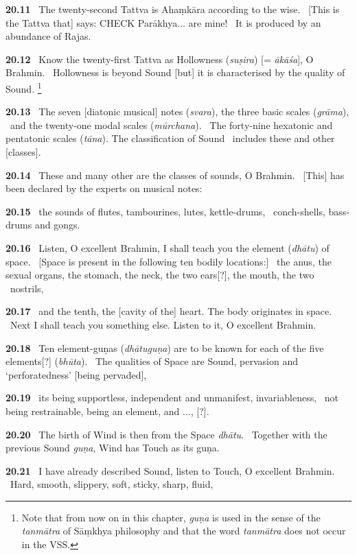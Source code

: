 \documentclass{article}
\newcommand{\skt}[1]{\textit{#1}}
\begin{document}
\textbf{20.11}%
\ The twenty-second Tattva is Ahaṃkāra according to the wise.%
\ [This is the Tattva that] says: CHECK Parākhya...  are mine!%
\                        It is produced by an abundance of Rajas.%


\textbf{20.12}%
\ Know the twenty-first Tattva as Hollowness (\skt{suṣira}) [= \skt{ākāśa}], O Brahmin.%
\ Hollowness is beyond Sound [but] it is characterised by the quality of Sound.%
\footnote{Note that from now on in this chapter, \skt{guṇa} is used in the sense of the \skt{tanmātra} of Sāṃkhya philosophy        and that the word \skt{tanmātra} does not occur in the VSS. }%


\textbf{20.13}%
\ The seven [diatonic musical] notes (\skt{svara}), the three basic scales (\skt{grāma}),%
\                and the twenty-one modal scales (\skt{mūrchana}).%
\ The forty-nine hexatonic and pentatonic scales (\skt{tāna}). The classification of Sound%
\                                 includes these and other [classes].%


\textbf{20.14}%
\ These and many other are the classes of sounds, O Brahmin.%
\ [This] has been declared by the experts on musical notes:%


\textbf{20.15}%
\ the sounds of flutes, tambourines, lutes, kettle-drums,%
\ conch-shells, bass-drums and gongs.%


\textbf{20.16}%
\ Listen, O excellent Brahmin, I shall teach you the element (\skt{dhātu}) of space.%
\ [Space is present in the following ten bodily locations:]%
\                 the anus, the sexual organs, the stomach, the neck, the two ears[?], the mouth, the two%
\                                         nostrils,%


\textbf{20.17}%
\ and the tenth, the [cavity of the] heart. The body originates in space.%
\ Next I shall teach you something else. Listen to it, O excellent Brahmin.%


\textbf{20.18}%
\ Ten element-guṇas (\skt{dhātuguṇa}) are to be known for each of the five elements[?] (\skt{bhūta}).%
\ The qualities of Space are Sound, pervasion and `perforatedness' [being pervaded],%


\textbf{20.19}%
\ its being supportless, independent and unmanifest, invariableness,%
\ not being restrainable, being an element, and ...,  [?].%


\textbf{20.20}%
\ The birth of Wind is then from the Space \skt{dhātu}.%
\ Together with the previous Sound \skt{guṇa}, Wind has Touch as its guṇa.%


\textbf{20.21}%
\ I have already described Sound, listen to Touch, O excellent Brahmin.%
\ Hard, smooth, slippery, soft, sticky, sharp, fluid,%
\end{document}
